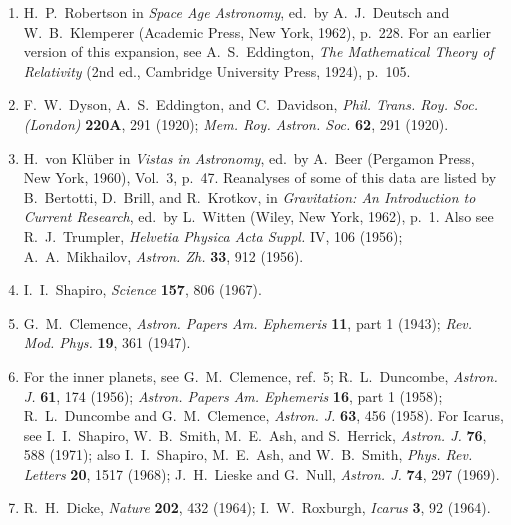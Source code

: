 \begin{enumerate}
  \item {}\label{ch8-ref-1}
  H.~P.~Robertson in \emph{Space Age Astronomy}, ed.\ by A.~J.~Deutsch and
  W.~B.~Klemperer (Academic Press, New York, 1962), p.~228. For an earlier
  version of this expansion, see A.~S.~Eddington,
  \emph{The Mathematical Theory of Relativity} (2nd ed., Cambridge
  University Press, 1924), p.~105.

  \item {}\label{ch8-ref-2}
  F.~W.~Dyson, A.~S.~Eddington, and C.~Davidson,
  \emph{Phil. Trans. Roy. Soc. (London)} \textbf{220A}, 291 (1920);
  \emph{Mem. Roy. Astron. Soc.} \textbf{62}, 291 (1920).

  \item {}\label{ch8-ref-3}
  H.~von Kl\"uber in \emph{Vistas in Astronomy}, ed.\ by A.~Beer
  (Pergamon Press, New York, 1960), Vol.~3, p.~47. Reanalyses of some of
  this data are listed by B.~Bertotti, D.~Brill, and R.~Krotkov, in
  \emph{Gravitation: An Introduction to Current Research}, ed.\ by
  L.~Witten (Wiley, New York, 1962), p.~1. Also see R.~J.~Trumpler,
  \emph{Helvetia Physica Acta Suppl.} IV, 106 (1956);
  A.~A.~Mikhailov, \emph{Astron. Zh.} \textbf{33}, 912 (1956).

  \item {}\label{ch8-ref-4}
  I.~I.~Shapiro, \emph{Science} \textbf{157}, 806 (1967).

  \item {}\label{ch8-ref-5}
  G.~M.~Clemence, \emph{Astron. Papers Am. Ephemeris} \textbf{11}, part 1
  (1943); \emph{Rev. Mod. Phys.} \textbf{19}, 361 (1947).

  \item {}\label{ch8-ref-6}
  For the inner planets, see G.~M.~Clemence, ref.~5;
  R.~L.~Duncombe, \emph{Astron. J.} \textbf{61}, 174 (1956);
  \emph{Astron. Papers Am. Ephemeris} \textbf{16}, part 1 (1958);
  R.~L.~Duncombe and G.~M.~Clemence, \emph{Astron. J.} \textbf{63}, 456
  (1958). For Icarus, see I.~I.~Shapiro, W.~B.~Smith, M.~E.~Ash, and
  S.~Herrick, \emph{Astron. J.} \textbf{76}, 588 (1971); also
  I.~I.~Shapiro, M.~E.~Ash, and W.~B.~Smith,
  \emph{Phys. Rev. Letters} \textbf{20}, 1517 (1968);
  J.~H.~Lieske and G.~Null, \emph{Astron. J.} \textbf{74}, 297 (1969).

  \item {}\label{ch8-ref-7}
  R.~H.~Dicke, \emph{Nature} \textbf{202}, 432 (1964);
  I.~W.~Roxburgh, \emph{Icarus} \textbf{3}, 92 (1964).


\end{enumerate}
